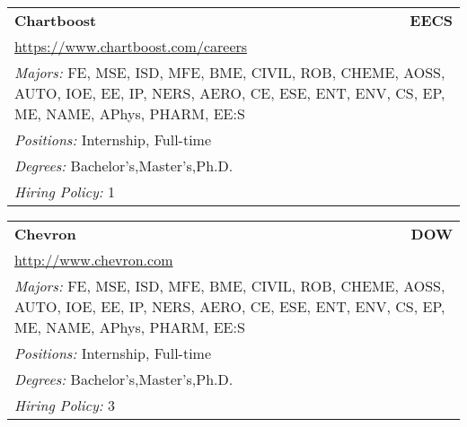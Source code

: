 \documentclass[twoside]{article}
\begin{document}
\begin{center}
\begin{multicols}{3}
\begin{FlushLeft}
\begin{minipage}{\columnwidth}\begin{tabularx}{.95\columnwidth}{Xr}
                 {\Large\bf Chartboost} & {\Large\bf EECS}\\
    \multicolumn{2}{p{.95\columnwidth}}{\url{https://www.chartboost.com/careers}}\\
    \multicolumn{2}{p{.95\columnwidth}}{\emph{Majors:} FE, MSE, ISD, MFE, BME, CIVIL, ROB, CHEME, AOSS, AUTO, IOE, EE, IP, NERS, AERO, CE, ESE, ENT, ENV, CS, EP, ME, NAME, APhys, PHARM, EE:S}\\
    \multicolumn{2}{p{.95\columnwidth}}{\emph{Positions:} Internship, Full-time}\\
    \multicolumn{2}{p{.95\columnwidth}}{\emph{Degrees:} Bachelor's,Master's,Ph.D.}\\
    \multicolumn{2}{p{.95\columnwidth}}{\emph{Hiring Policy:} 1}\\
    \end{tabularx}
    
\end{minipage}
 
\begin{minipage}{\columnwidth}\begin{tabularx}{.95\columnwidth}{Xr}
                 {\Large\bf Chevron} & {\Large\bf DOW}\\
    \multicolumn{2}{p{.95\columnwidth}}{\url{http://www.chevron.com}}\\
    \multicolumn{2}{p{.95\columnwidth}}{\emph{Majors:} FE, MSE, ISD, MFE, BME, CIVIL, ROB, CHEME, AOSS, AUTO, IOE, EE, IP, NERS, AERO, CE, ESE, ENT, ENV, CS, EP, ME, NAME, APhys, PHARM, EE:S}\\
    \multicolumn{2}{p{.95\columnwidth}}{\emph{Positions:} Internship, Full-time}\\
    \multicolumn{2}{p{.95\columnwidth}}{\emph{Degrees:} Bachelor's,Master's,Ph.D.}\\
    \multicolumn{2}{p{.95\columnwidth}}{\emph{Hiring Policy:} 3}\\
    \end{tabularx}
    
\end{minipage}
 

\end{FlushLeft}
\end{multicols}
\end{center}
\end{document}
